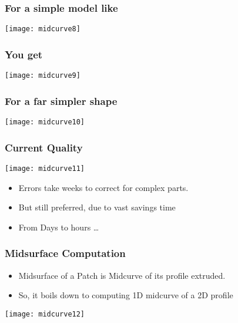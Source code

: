 \begin{frame}[fragile]\frametitle{For a simple model like}
\begin{center}
\texttt{[image: midcurve8]}
\end{center}	
\end{frame}

\begin{frame}[fragile]\frametitle{You get}
\begin{center}
\texttt{[image: midcurve9]}
\end{center}	
\end{frame}

\begin{frame}[fragile]\frametitle{For a far simpler shape}
\begin{center}
\texttt{[image: midcurve10]}
\end{center}	
\end{frame}

\begin{frame}[fragile]\frametitle{Current Quality}
\begin{center}
\texttt{[image: midcurve11]}
\end{center}
	\begin{itemize}
	\item Errors take weeks to correct for complex parts.
	\item But still preferred, due to vast savings time
	\item From Days to hours \ldots
	\end{itemize}
	
\end{frame}

\begin{frame}[fragile]\frametitle{Midsurface Computation}

	\begin{itemize}
	\item Midsurface of a Patch is Midcurve of its profile extruded.
	\item So, it boils down to computing 1D midcurve of a 2D profile
	\end{itemize}
	
\begin{center}
\texttt{[image: midcurve12]}
\end{center}	
\end{frame}

